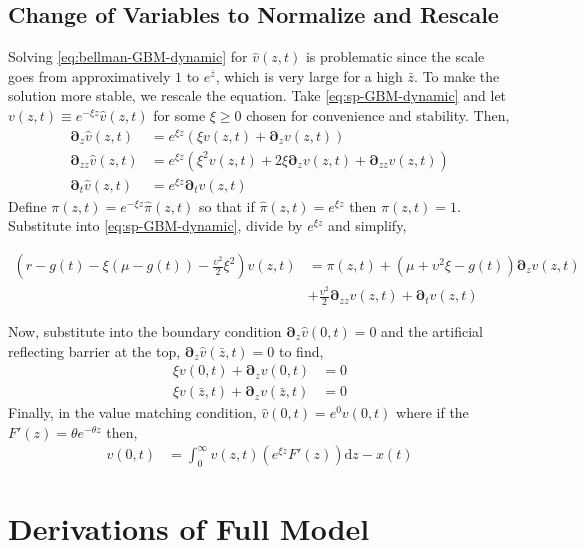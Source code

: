 \documentclass[11pt]{article}
\newcommand{\D}[1][]{\ensuremath{\boldsymbol{\partial}_{#1}}}
\newcommand{\diff}{\ensuremath{\mathrm{d}}}
\begin{document}
\subsection{Change of Variables to Normalize and Rescale}\label{eq:simple-rescale}
Solving \cref{eq:bellman-GBM-dynamic} for $\hat{v}(z,t)$ is problematic since the scale goes from approximatively $1$ to $e^{\bar{z}}$, which is very large for a high $\bar{z}$.  To make the solution more stable, we rescale the equation.  Take \cref{eq:sp-GBM-dynamic} and let $ v(z,t) \equiv e^{-\xi z}\hat{v}(z,t)$ for some $\xi \geq 0$ chosen for convenience and stability.  Then,
\begin{align}
	\D[z]\hat{v}(z,t) &= e^{\xi z}\left(\xi v(z,t) + \D[z]v(z,t) \right)\\
	\D[zz]\hat{v}(z,t) &= e^{\xi z}\left(\xi^{2} v(z,t) + 2 \xi\D[z]v(z,t) + \D[zz]v(z,t)  \right)\\	
	\D[t]\hat{v}(z,t) &= e^{\xi z} \D[t]v(z,t)
\end{align}
Define $\pi(z,t) = e^{-\xi z}\hat{\pi}(z,t)$ so that if $\hat{\pi}(z,t) = e^{\xi z}$ then $\pi(z,t) = 1$.  Substitute into \cref{eq:sp-GBM-dynamic}, divide by $e^{\xi z}$ and simplify,

\begin{align}
	\left(r - g(t)- \xi(\mu-g(t)) - \frac{\upsilon^2}{2}\xi^2\right)  v(z,t) &= \pi(z,t) + (\mu+ \upsilon^2\xi - g(t)) \D[z]v(z,t) \nonumber \\ &+ \tfrac{\upsilon^2}{2} \D[zz]v(z,t) + \D[t]v(z,t)  \label{eq:bellman-GBM-dynamic-normalized}
\end{align}

Now, substitute into the boundary condition $\D[z]\hat{v}(0,t) = 0$ and the artificial reflecting barrier at the top, $\D[z]\hat{v}(\bar{z},t) = 0$ to find,
\begin{align}
	\xi v(0,t) + \D[z]v(0,t ) &= 0\label{eq:new-BC1}\\
	\xi v(\bar{z},t) + \D[z]v(\bar{z},t) &= 0\label{eq:new-BC2}
\end{align}	
Finally, in the value matching condition, $\hat{v}(0,t) = e^{0} v(0,t)$ where if the $F'(z) = \theta e^{-\theta z}$ then,
\begin{align}
	 v(0,t) &= \int_{0}^{\infty}  v(z,t) \left(e^{\xi z} F'(z)\right) \diff z - x(t)\label{eq:vm-GBM-dynamic-normalized}
\end{align}	

\section{Derivations of Full Model}\label{sec:full-model-derivations}
\end{document}
